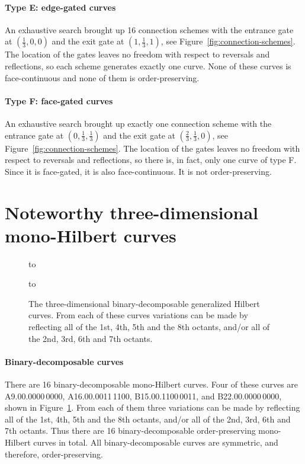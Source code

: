 \documentclass[11pt,a4paper]{article}
\begin{document}
\paragraph{Type E: edge-gated curves}

An exhaustive search brought up 16 connection schemes with the entrance gate at $(\frac13,0,0)$ and the exit gate at $(1,\frac13,1)$, see Figure~\ref{fig:connection-schemes}. The location of the gates leaves no freedom with respect to reversals and reflections, so each scheme generates exactly one curve. None of these curves is face-continuous and none of them is order-preserving.

\paragraph{Type F: face-gated curves}

An exhaustive search brought up exactly one connection scheme with the entrance gate at $(0,\frac13,\frac13)$ and the exit gate at $(\frac23,\frac13,0)$, see Figure~\ref{fig:connection-schemes}. The location of the gates leaves no freedom with respect to reversals and reflections, so there is, in fact, only one curve of type F. Since it is face-gated, it is also face-continuous. It is not order-preserving.

\section{Noteworthy three-dimensional mono-Hilbert curves}

\begin{figure}
\centering
\hbox to \hsize{\hfill
\texttt{[image: A9-00-00]}\hfill
\texttt{[image: A16-00-3c]}\hfill
}

\addvspace\baselineskip
\hbox to \hsize{\hfill
\texttt{[image: B15-00-c3]}\hfill
\texttt{[image: B22-00-00]}\hfill
}
\caption{The three-dimensional binary-decomposable generalized Hilbert curves. From each of these curves variations can be made by reflecting all of the 1st, 4th, 5th and the 8th octants, and/or all of the 2nd, 3rd, 6th and 7th octants.}
\label{fig:decomposable-curves}
\end{figure}

\paragraph{Binary-decomposable curves}\label{sec:binary-decomposable}
There are 16 binary-decomposable mono-Hilbert curves. Four of these curves are A9.00.0000\,0000, A16.00.0011\,1100, B15.00.1100\,0011, and B22.00.0000\,0000, shown in Figure~\ref{fig:decomposable-curves}. From each of them three variations can be made by reflecting all of the 1st, 4th, 5th and the 8th octants, and/or all of the 2nd, 3rd, 6th and 7th octants. Thus there are 16 binary-decomposable order-preserving mono-Hilbert curves in total. All binary-decomposable curves are symmetric, and therefore, order-preserving.
\end{document}
